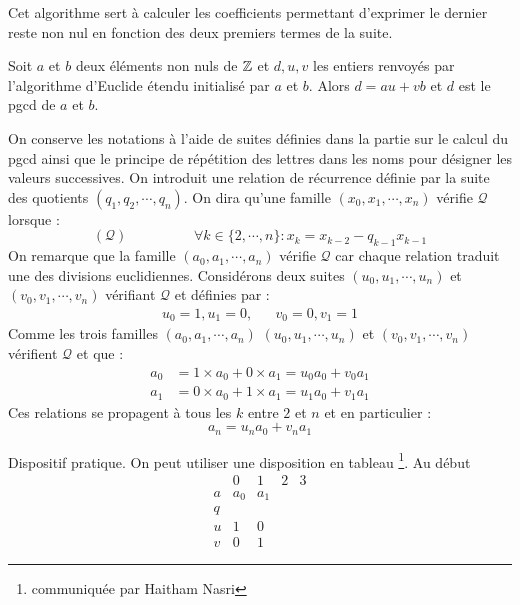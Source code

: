 Cet algorithme sert à calculer les coefficients permettant d'exprimer le dernier reste non nul en fonction des deux premiers termes de la suite.
\begin{propn}\label{coeff}
 Soit $a$ et $b$ deux éléments non nuls de $\mathbb{Z}$ et $d, u, v$ les entiers renvoyés par l'algorithme d'Euclide étendu initialisé par $a$ et $b$. Alors $d = au + vb$ et $d$ est le pgcd de $a$ et $b$. 
\end{propn}
\begin{demo}
On conserve les notations à l'aide de suites définies dans la partie sur le calcul du pgcd ainsi que le principe de répétition des lettres dans les noms pour désigner les valeurs successives.\newline
On introduit une relation de récurrence définie par la suite des quotients $(q_1,q_2,\cdots,q_n)$. On dira qu'une famille $(x_0,x_1,\cdots,x_n)$ vérifie $\mathcal Q$ lorsque :
\begin{displaymath}
 (\mathcal Q)\hspace{2cm} \forall k\in\{2,\cdots,n\} : x_k = x_{k-2}-q_{k-1}x_{k-1}
\end{displaymath}
On remarque que la famille $(a_0,a_1,\cdots,a_n)$ vérifie $\mathcal Q$ car chaque relation traduit une des divisions euclidiennes. Considérons deux suites $(u_0,u_1,\cdots,u_n)$ et $(v_0,v_1,\cdots,v_n)$ vérifiant $\mathcal Q$ et définies par :
\begin{align*}
 u_0=1, u_1=0,  & & v_0=0, v_1=1
\end{align*}
Comme les trois familles $(a_0,a_1,\cdots,a_n)$ $(u_0,u_1,\cdots,u_n)$ et $(v_0,v_1,\cdots,v_n)$ vérifient $\mathcal Q$ et que :
\begin{align*}
 a_0 &= 1\times a_0 + 0\times a_1 = u_0a_0 + v_0a_1 \\
 a_1 &= 0\times a_0 + 1\times a_1 = u_1a_0 + v_1a_1
\end{align*}
Ces relations se propagent à tous les $k$ entre $2$ et $n$ et en particulier :
\begin{displaymath}
 a_n = u_na_0 + v_na_1
\end{displaymath}
\end{demo}
Dispositif pratique. On peut utiliser une disposition en tableau \footnote{communiquée par Haitham Nasri}. Au début
\begin{displaymath}
\begin{array}{l|l|l|l|l}
 & 0 & 1 & 2 & 3 \\ \hline
a & a_0 & a_1 &   &   \\
q &   &   &   &   \\
u & 1 & 0 &   &   \\
v & 0 & 1 &   &
\end{array}
\end{displaymath}
